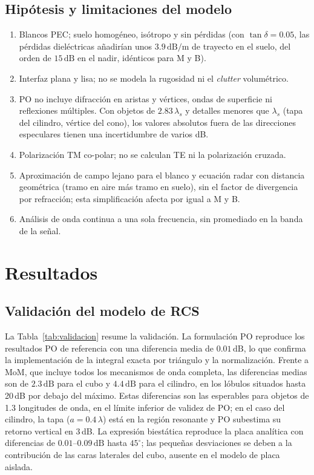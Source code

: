 \documentclass[11pt,a4paper]{report}
\newcommand{\dB}{\,\mathrm{dB}}
\begin{document}
\section{Hipótesis y limitaciones del modelo}
\label{sec:limitaciones}

\begin{enumerate}[itemsep=2pt]
  \item Blancos PEC; suelo homogéneo, isótropo y sin pérdidas (con
  $\tan\delta=0.05$, las pérdidas dieléctricas añadirían unos
  $3.9\dB/\mathrm{m}$ de trayecto en el suelo, del orden de $15\dB$ en el
  nadir, idénticos para M y B).
  \item Interfaz plana y lisa; no se modela la rugosidad ni el
  \emph{clutter} volumétrico.
  \item PO no incluye difracción en aristas y vértices, ondas de
  superficie ni reflexiones múltiples. Con objetos de $2.83\,\lambda_s$ y
  detalles menores que $\lambda_s$ (tapa del cilindro, vértice del cono),
  los valores absolutos fuera de las direcciones especulares tienen una
  incertidumbre de varios dB.
  \item Polarización TM co-polar; no se calculan TE ni la polarización
  cruzada.
  \item Aproximación de campo lejano para el blanco y ecuación radar con
  distancia geométrica (tramo en aire más tramo en suelo), sin el factor de
  divergencia por refracción; esta simplificación afecta por igual a M y B.
  \item Análisis de onda continua a una sola frecuencia, sin promediado en
  la banda de la señal.
\end{enumerate}

\chapter{Resultados}
\label{cap:resultados}

\section{Validación del modelo de RCS}
\label{sec:validacion}

La Tabla~\ref{tab:validacion} resume la validación. La formulación PO
reproduce los resultados PO de referencia con una diferencia media de
$0.01\dB$, lo que confirma la implementación de la integral exacta por
triángulo y la normalización. Frente a MoM, que incluye todos los
mecanismos de onda completa, las diferencias medias son de $2.3\dB$ para el
cubo y $4.4\dB$ para el cilindro, en los lóbulos situados hasta 20\,dB por
debajo del máximo. Estas diferencias son las esperables para objetos de
1.3 longitudes de onda, en el límite inferior de validez de PO; en el
caso del cilindro, la tapa ($a=0.4\,\lambda$) está en la región resonante y
PO subestima su retorno vertical en 3\,dB. La expresión biestática
reproduce la placa analítica con diferencias de $0.01$--$0.09\dB$ hasta
$45^\circ$; las pequeñas desviaciones se deben a la contribución de las
caras laterales del cubo, ausente en el modelo de placa aislada.
\end{document}

